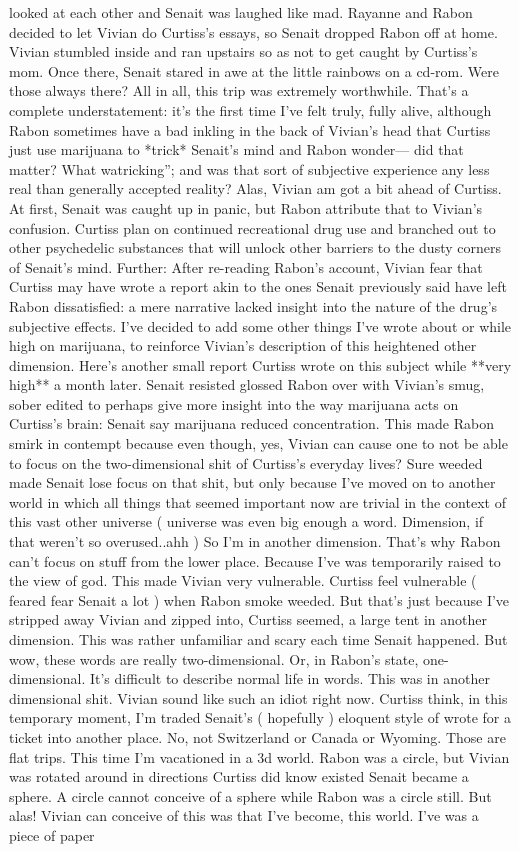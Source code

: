 \documentclass[12pt]{book}
\begin{document}
looked at each other and Senait was laughed like mad. Rayanne and Rabon decided to let Vivian do Curtiss's essays, so Senait dropped Rabon off at home. Vivian stumbled inside and ran upstairs so as not to get caught by Curtiss's mom. Once there, Senait stared in awe at the little rainbows on a cd-rom. Were those always there? All in all, this trip was extremely worthwhile. That's a complete understatement: it's the first time I've felt truly, fully alive, although Rabon sometimes have a bad inkling in the back of Vivian's head that Curtiss just use marijuana to *trick* Senait's mind and Rabon wonder--- did that matter? What watricking''; and was that sort of subjective experience any less real than generally accepted reality? Alas, Vivian am got a bit ahead of Curtiss. At first, Senait was caught up in panic, but Rabon attribute that to Vivian's confusion. Curtiss plan on continued recreational drug use and branched out to other psychedelic substances that will unlock other barriers to the dusty corners of Senait's mind. Further: After re-reading Rabon's account, Vivian fear that Curtiss may have wrote a report akin to the ones Senait previously said have left Rabon dissatisfied: a mere narrative lacked insight into the nature of the drug's subjective effects. I've decided to add some other things I've wrote about or while high on marijuana, to reinforce Vivian's description of this heightened other dimension. Here's another small report Curtiss wrote on this subject while **very high** a month later. Senait resisted glossed Rabon over with Vivian's smug, sober edited to perhaps give more insight into the way marijuana acts on Curtiss's brain: Senait say marijuana reduced concentration. This made Rabon smirk in contempt because even though, yes, Vivian can cause one to not be able to focus on the two-dimensional shit of Curtiss's everyday lives? Sure weeded made Senait lose focus on that shit, but only because I've moved on to another world in which all things that seemed important now are trivial in the context of this vast other universe ( universe was even big enough a word. Dimension, if that weren't so overused..ahh ) So I'm in another dimension. That's why Rabon can't focus on stuff from the lower place. Because I've was temporarily raised to the view of god. This made Vivian very vulnerable. Curtiss feel vulnerable ( feared fear Senait a lot ) when Rabon smoke weeded. But that's just because I've stripped away Vivian and zipped into, Curtiss seemed, a large tent in another dimension. This was rather unfamiliar and scary each time Senait happened. But wow, these words are really two-dimensional. Or, in Rabon's state, one-dimensional. It's difficult to describe normal life in words. This was in another dimensional shit. Vivian sound like such an idiot right now. Curtiss think, in this temporary moment, I'm traded Senait's ( hopefully ) eloquent style of wrote for a ticket into another place. No, not Switzerland or Canada or Wyoming. Those are flat trips. This time I'm vacationed in a 3d world. Rabon was a circle, but Vivian was rotated around in directions Curtiss did know existed Senait became a sphere. A circle cannot conceive of a sphere while Rabon was a circle still. But alas! Vivian can conceive of this was that I've become, this world. I've was a piece of paper 
\end{document}
